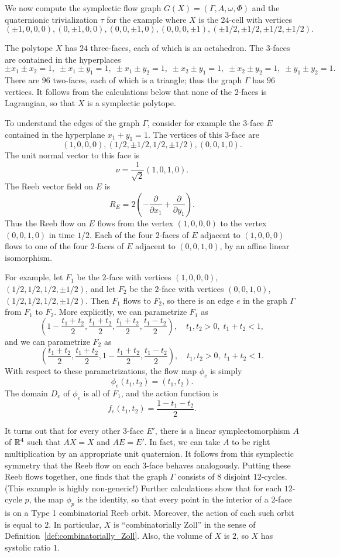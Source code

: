 We now compute the symplectic flow graph $G(X)=(\Gamma,A,\omega,\Phi)$ and the quaternionic trivialization $\tau$ for the example where $X$ is the $24$-cell with vertices
\[
(\pm1,0,0,0),(0,\pm1,0,0),(0,0,\pm1,0),(0,0,0,\pm1),(\pm1/2,\pm1/2,\pm1/2,\pm1/2).
\]

The polytope $X$ has $24$ three-faces, each of which is an octahedron. The $3$-faces are contained in the hyperplaces
\[
\pm x_1 \pm x_2 = 1,\; \pm x_1 \pm y_1 = 1,\; \pm x_1 \pm y_2 = 1, \; \pm x_2 \pm y_1 = 1, \; \pm x_2 \pm y_2 = 1, \; \pm y_1 \pm y_2 = 1.
\]
There are $96$ two-faces, each of which is a triangle; thus the graph $\Gamma$ has $96$ vertices. It follows from the calculations below that none of the $2$-faces is Lagrangian, so that $X$ is a symplectic polytope.

To understand the edges of the graph $\Gamma$, consider for example the $3$-face $E$ contained in the hyperplane $x_1+y_1=1$. The vertices of this $3$-face are
\[
(1,0,0,0), (1/2,\pm1/2,1/2,\pm1/2), (0,0,1,0).
\]
The unit normal vector to this face is
\[
\nu = \frac{1}{\sqrt{2}}(1,0,1,0).
\]
The Reeb vector field on $E$ is
\[
R_E = 2\left(-\frac{\partial}{\partial x_1} + \frac{\partial}{\partial y_1}\right).
\]
Thus the Reeb flow on $E$ flows from the vertex $(1,0,0,0)$ to the vertex $(0,0,1,0)$ in time $1/2$. Each of the four $2$-faces of $E$ adjacent to $(1,0,0,0)$ flows to one of the four $2$-faces of $E$ adjacent to $(0,0,1,0)$, by an affine linear isomorphism.

For example, let $F_1$ be the $2$-face with vertices $(1,0,0,0)$, $(1/2,1/2,1/2,\pm 1/2)$, and let $F_2$ be the $2$-face with vertices $(0,0,1,0)$, $(1/2,1/2,1/2,\pm 1/2)$. Then $F_1$ flows to $F_2$, so there is an edge $e$ in the graph $\Gamma$ from $F_1$ to $F_2$. More explicitly, we can parametrize $F_1$ as
\[
\left(1-\frac{t_1+t_2}{2}, \frac{t_1+t_2}{2}, \frac{t_1+t_2}{2}, \frac{t_1-t_2}{2}\right), \quad t_1,t_2>0, \; t_1+t_2<1,
\]
and we can parametrize $F_2$ as
\[
\left(\frac{t_1+t_2}{2}, \frac{t_1+t_2}{2}, 1 - \frac{t_1+t_2}{2}, \frac{t_1-t_2}{2}\right), \quad t_1,t_2>0, \; t_1+t_2<1.
\]
With respect to these parametrizations, the flow map $\phi_e$ is simply
\[
\phi_e(t_1,t_2) = (t_1,t_2).
\]
The domain $D_e$ of $\phi_e$ is all of $F_1$, and the action function is
\[
f_e(t_1,t_2) = \frac{1-t_1-t_2}{2}.
\]

It turns out that for every other $3$-face $E'$, there is a linear symplectomorphism $A$ of ${\mathbb R}^4$ such that $AX=X$ and $AE=E'$. In fact, we can take $A$ to be right multiplication by an appropriate unit quaternion. It follows from this symplectic symmetry that the Reeb flow on each $3$-face behaves analogously. Putting these Reeb flows together, one finds that the graph $\Gamma$ consists of $8$ disjoint $12$-cycles. (This example is highly non-generic!) Further calculations show that for each $12$-cycle $p$, the map $\phi_p$ is the identity, so that every point in the interior of a $2$-face is on a Type 1 combinatorial Reeb orbit. Moreover, the action of each such orbit is equal to $2$. In particular, $X$ is ``combinatorially Zoll'' in the sense of Definition~\ref{def:combinatorially_Zoll}. Also, the volume of $X$ is $2$, so $X$ has systolic ratio $1$.

